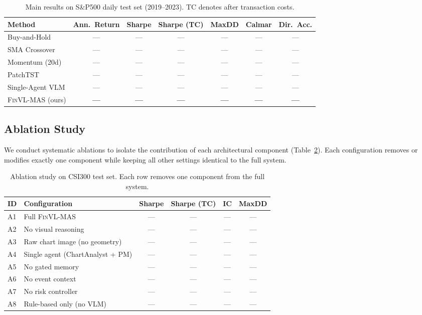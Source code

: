 \begin{table}[t]
\centering
\caption{Main results on S\&P500 daily test set (2019--2023). TC denotes after transaction costs.}
\label{tab:main_sp500}
\begin{tabular}{lcccccc}
\toprule
Method & Ann.~Return & Sharpe & Sharpe (TC) & MaxDD & Calmar & Dir.~Acc. \\
\midrule
Buy-and-Hold     & ---  & ---  & ---  & ---  & --- & --- \\
SMA Crossover    & ---  & ---  & ---  & ---  & --- & --- \\
Momentum (20d)   & ---  & ---  & ---  & ---  & --- & --- \\
PatchTST         & ---  & ---  & ---  & ---  & --- & --- \\
Single-Agent VLM & ---  & ---  & ---  & ---  & --- & --- \\
\midrule
\textsc{FinVL-MAS} (ours) & \textbf{---} & \textbf{---} & \textbf{---} & \textbf{---} & \textbf{---} & \textbf{---} \\
\bottomrule
\end{tabular}
\end{table}


\subsection{Ablation Study}

We conduct systematic ablations to isolate the contribution of each architectural component (Table~\ref{tab:ablation}). Each configuration removes or modifies exactly one component while keeping all other settings identical to the full system.

\begin{table}[t]
\centering
\caption{Ablation study on CSI300 test set. Each row removes one component from the full system.}
\label{tab:ablation}
\begin{tabular}{llcccc}
\toprule
ID & Configuration & Sharpe & Sharpe (TC) & IC & MaxDD \\
\midrule
A1 & Full \textsc{FinVL-MAS}            & --- & --- & --- & --- \\
A2 & No visual reasoning                & --- & --- & --- & --- \\
A3 & Raw chart image (no geometry)       & --- & --- & --- & --- \\
A4 & Single agent (ChartAnalyst + PM)    & --- & --- & --- & --- \\
A5 & No gated memory                     & --- & --- & --- & --- \\
A6 & No event context                    & --- & --- & --- & --- \\
A7 & No risk controller                  & --- & --- & --- & --- \\
A8 & Rule-based only (no VLM)            & --- & --- & --- & --- \\
\bottomrule
\end{tabular}
\end{table}

